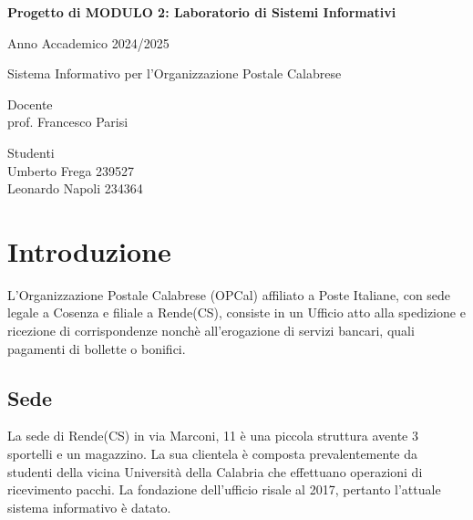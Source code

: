 \documentclass{article}
\author{Umberto Frega, Leonardo Napoli}
\begin{document}
\pagestyle{fancy}

\begin{titlepage}
    \centering
    {\Large \bfseries Progetto di MODULO 2: Laboratorio di Sistemi Informativi\par}
    {\Large Anno Accademico 2024/2025 \par}
    \vspace{1cm} %
    \vfill
    {\huge Sistema Informativo per l'Organizzazione Postale Calabrese\par}
    \vfill
\noindent
\begin{minipage}[t]{0.5\textwidth}
    \raggedright
     Docente \\  prof. Francesco Parisi
\end{minipage}%
\hfill
\begin{minipage}[t]{0.4\textwidth}
    \raggedleft
     Studenti \\ Umberto Frega 239527 \\ Leonardo Napoli 234364
\end{minipage}
    
\end{titlepage}

\section{Introduzione}
L'Organizzazione Postale Calabrese (OPCal) affiliato a Poste Italiane, con sede legale a Cosenza e filiale a Rende(CS), consiste in un Ufficio atto alla spedizione e ricezione di corrispondenze nonchè all'erogazione di servizi bancari, quali pagamenti di bollette o bonifici. 
\subsection{Sede}
La sede di Rende(CS) in via Marconi, 11 è una piccola struttura avente 3 sportelli e un magazzino. La sua clientela è composta prevalentemente da studenti della vicina Università della Calabria che effettuano operazioni di ricevimento pacchi. La fondazione dell'ufficio risale al 2017, pertanto l'attuale sistema informativo è datato. 
\end{document}
